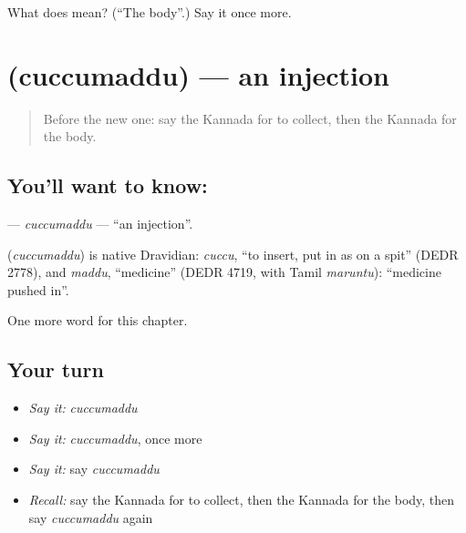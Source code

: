 \begin{tcolorbox}[breakable,colback=teal!4,colframe=teal!35!black,title={Before you move on}]
What does  mean? (\textquotedblleft{}The body\textquotedblright{}.) Say it once more.
\end{tcolorbox}
\section[\texorpdfstring{\kn{ಚುಚ್ಚುಮದ್ದು} (cuccumaddu)}{ಚುಚ್ಚುಮದ್ದು (cuccumaddu)}]{ (cuccumaddu) — an injection}

\label{lesson:KA-C208-cuccumaddu}



\begin{quote}
Before the new one: say the Kannada for to collect, then the Kannada for the body.
\end{quote}

\subsection*{You'll want to know: }
\textbf{} — \emph{cuccumaddu} — \textquotedblleft{}an injection\textquotedblright{}.

\begin{cousinweb}
\textbf{} (\emph{cuccumaddu}) is native Dravidian: \emph{cuccu}, \textquotedblleft{}to insert, put in as on a spit\textquotedblright{} (DEDR 2778), and \emph{maddu}, \textquotedblleft{}medicine\textquotedblright{} (DEDR 4719, with Tamil \emph{maruntu}): \textquotedblleft{}medicine pushed in\textquotedblright{}.
\end{cousinweb}

\begin{grammarlens}[title={What you've built}]
One more word for this chapter.
\end{grammarlens}

\subsection*{Your turn}
\begin{itemize}
\raggedright
  \item \emph{Say it:} \emph{cuccumaddu}
  \item \emph{Say it:} \emph{cuccumaddu}, once more
  \item \emph{Say it:} say \emph{cuccumaddu}
  \item \emph{Recall:} say the Kannada for to collect, then the Kannada for the body, then say \emph{cuccumaddu} again
\end{itemize}

